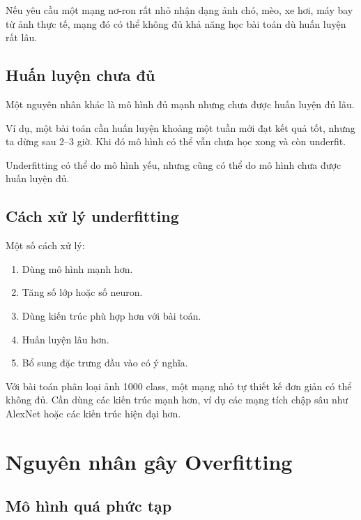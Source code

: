 \documentclass[12pt,a4paper]{report}
\begin{document}
\begin{vidu}
Nếu yêu cầu một mạng nơ-ron rất nhỏ nhận dạng ảnh chó, mèo, xe hơi, máy bay từ ảnh thực tế, mạng đó có thể không đủ khả năng học bài toán dù huấn luyện rất lâu.
\end{vidu}

\section{Huấn luyện chưa đủ}

Một nguyên nhân khác là mô hình đủ mạnh nhưng chưa được huấn luyện đủ lâu.

Ví dụ, một bài toán cần huấn luyện khoảng một tuần mới đạt kết quả tốt, nhưng ta dừng sau 2--3 giờ. Khi đó mô hình có thể vẫn chưa học xong và còn underfit.

\begin{ghinho}
Underfitting có thể do mô hình yếu, nhưng cũng có thể do mô hình chưa được huấn luyện đủ.
\end{ghinho}

\section{Cách xử lý underfitting}

Một số cách xử lý:

\begin{enumerate}
    \item Dùng mô hình mạnh hơn.
    \item Tăng số lớp hoặc số neuron.
    \item Dùng kiến trúc phù hợp hơn với bài toán.
    \item Huấn luyện lâu hơn.
    \item Bổ sung đặc trưng đầu vào có ý nghĩa.
\end{enumerate}

\begin{vidu}
Với bài toán phân loại ảnh 1000 class, một mạng nhỏ tự thiết kế đơn giản có thể không đủ. Cần dùng các kiến trúc mạnh hơn, ví dụ các mạng tích chập sâu như AlexNet hoặc các kiến trúc hiện đại hơn.
\end{vidu}

\chapter{Nguyên nhân gây Overfitting}

\section{Mô hình quá phức tạp}
\end{document}
